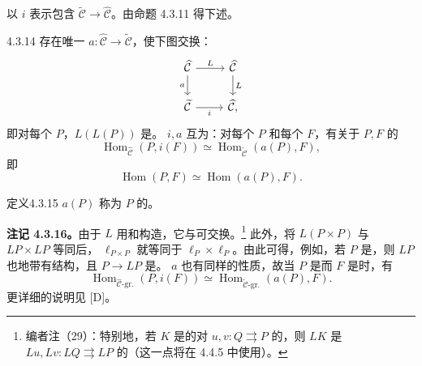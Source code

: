 以 $i$ 表示包含 $\widetilde{\mathcal C}\to\widehat{\mathcal C}$。由命题 4.3.11 得下述。
\begin{SGAresult}{}{4.3.14}
存在唯一 $a:\widehat{\mathcal C}\to\widetilde{\mathcal C}$，使下图交换：
\[
\begin{tikzcd}
\widehat{\mathcal C}\arrow[r,"L"]\arrow[d,"a"']&\widehat{\mathcal C}\arrow[d,"L"]\\
\widetilde{\mathcal C}\arrow[r,"i"']&\widehat{\mathcal C},
\end{tikzcd}
\]
即对每个 $P$，$L(L(P))$ 是。 $i,a$ 互为：对每个 $P$ 和每个 $F$，有关于 $P,F$ 的
\[
\operatorname{Hom}_{\widehat{\mathcal C}}(P,i(F))\simeq\operatorname{Hom}_{\widetilde{\mathcal C}}(a(P),F),
\]
即
\[
\operatorname{Hom}(P,F)\simeq\operatorname{Hom}(a(P),F).
\]
\end{SGAresult}
\begin{SGAresult}{定义}{4.3.15}
 $a(P)$ 称为 $P$ 的。
\end{SGAresult}
\textbf{注记 4.3.16。}由于 $L$ 用和构造，它与可交换。\footnote{编者注（29）：特别地，若 $K$ 是的对 $u,v:Q\rightrightarrows P$ 的，则 $LK$ 是 $Lu,Lv:LQ\rightrightarrows LP$ 的（这一点将在 4.4.5 中使用）。}
此外，将 $L(P\times P)$ 与 $LP\times LP$ 等同后， $\ell_{P\times P}$ 就等同于 $\ell_P\times\ell_P$。由此可得，例如，若 $P$ 是，则 $LP$ 也地带有结构，且 $P\to LP$ 是。 $a$ 也有同样的性质，故当 $P$ 是而 $F$ 是时，有
\[
\operatorname{Hom}_{\widehat{\mathcal C}\text{-gr.}}(P,i(F))\simeq
\operatorname{Hom}_{\widetilde{\mathcal C}\text{-gr.}}(a(P),F).
\]
更详细的说明见 [D]。

